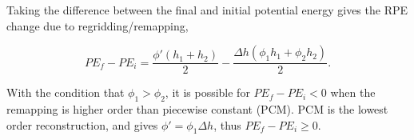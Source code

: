 Taking the difference between the final and initial potential energy gives the RPE change due to regridding/remapping,

\begin{equation}
  PE_f - PE_i = \frac{\phi'\left(h_1 + h_2\right)}{2} - \frac{\Delta h\left(\phi_1 h_1 + \phi_2 h_2\right)}{2}.
\end{equation}

With the condition that $\phi_1 > \phi_2$, it is possible for $PE_f - PE_i < 0$ when the remapping is higher order than piecewise constant (PCM). PCM is the lowest order reconstruction, and gives $\phi' = \phi_1 \Delta h$, thus $PE_f - PE_i \ge 0$.
